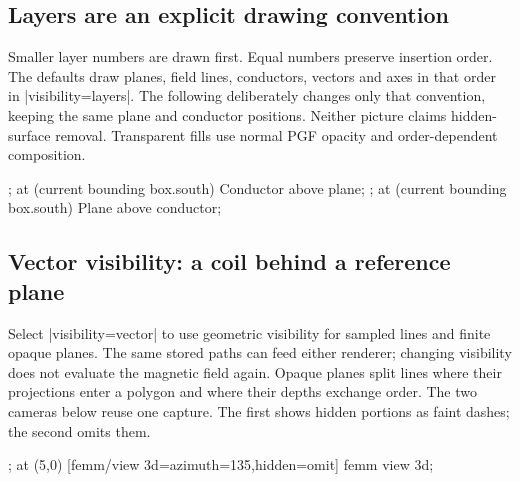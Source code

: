 \subsection{Layers are an explicit drawing convention}
Smaller layer numbers are drawn first. Equal numbers preserve insertion order.
The defaults draw planes, field lines, conductors, vectors and axes in that
order in |visibility=layers|. The following deliberately changes only that convention, keeping the
same plane and conductor positions. Neither picture claims hidden-surface
removal. Transparent fills use normal PGF opacity and order-dependent composition.
\begin{codeexample}[width=0pt]
\begingroup
{}
 \femmbiotsource[current=1]
 \femmbiotscene[name=layer-demo,field=false]
\endtikzpicture
\femmviewplane[scene=layer-demo,plane=xz,
 umin=-1.4,umax=1.4,vmin=-.8,vmax=.8,
 layer=15,style={fill=blue!15,fill opacity=.7}]
\tikzpicture[femm/view 3d={scene=layer-demo,axes=none,
 xmin=-1.5,xmax=1.5,ymin=-1.2,ymax=1.2,zmin=-.9,zmax=.9,
 coordinate scale=.8,azimuth=-30,elevation=20}]
 ;
 \node[below=3mm] at (current bounding box.south) {Conductor above plane};
\endtikzpicture
\quad
\tikzpicture[femm/view 3d={scene=layer-demo,axes=none,
 xmin=-1.5,xmax=1.5,ymin=-1.2,ymax=1.2,zmin=-.9,zmax=.9,
 coordinate scale=.8,azimuth=-30,elevation=20,geometry layer=10}]
 ;
 \node[below=3mm] at (current bounding box.south) {Plane above conductor};
\endtikzpicture
{}
\endgroup
\end{codeexample}

\subsection{Vector visibility: a coil behind a reference plane}
Select |visibility=vector| to use geometric visibility for sampled lines and
finite opaque planes. The same stored paths can feed either renderer; changing
visibility does not evaluate the magnetic field again. Opaque planes split lines
where their projections enter a polygon and where their depths exchange order.
The two cameras below reuse one capture. The first shows hidden portions as
faint dashes; the second omits them.
\begin{codeexample}[width=0pt]
\begingroup
\tikzpicture[femm/biot,
 femm/biot view={seeds={.3/0/0;-.3/0/0},
 step=.15,maximum length=8}]
 \femmbiotsource[kind=solenoid,winding=helix,
  closure=contribution,current=2,radius=.8,length=2,turns=4]
 \femmbiotscene[name=cutaway-coil]
\endtikzpicture
\femmviewplane[scene=cutaway-coil,plane=xz,
 umin=-1.3,umax=1.3,vmin=-1.3,vmax=1.3,
 grid=major,step=.5,style={fill=blue!10}]
\tikzpicture[femm/view 3d={scene=cutaway-coil,
 visibility=vector,hidden=dashed,mark spacing=1,
 coordinate scale=.8,xmin=-1.5,xmax=1.5,
 ymin=-1.5,ymax=1.5,zmin=-1.5,zmax=1.5}]
 ;
 \pic at (5,0) [femm/view 3d={azimuth=135,hidden=omit}]
  {femm view 3d};
\endtikzpicture
{}
\endgroup
\end{codeexample}

